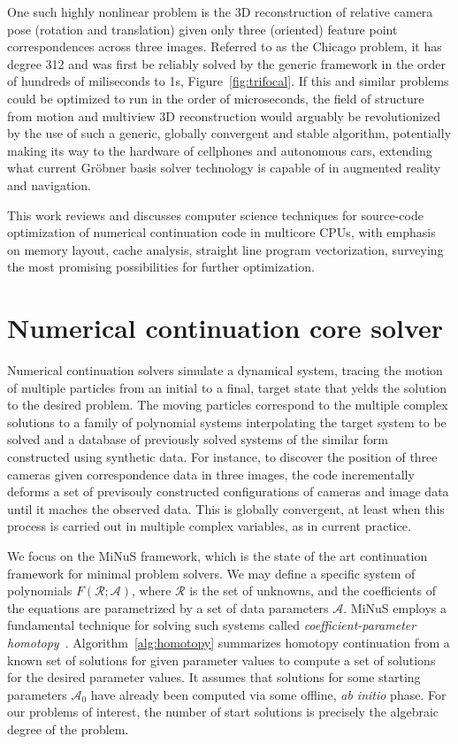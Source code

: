 \documentclass[10pt,conference]{IEEEtran}
\begin{document}
One such highly nonlinear problem is the 3D reconstruction of relative camera
pose (rotation and translation) given only three (oriented) feature point
correspondences across three images. Referred to as the Chicago problem, it has degree 312 and was first be
reliably solved by the generic framework in the order of hundreds of miliseconds
to 1s, Figure~\ref{fig:trifocal}. If this and similar problems could be
optimized to run in the order of microseconds, the field of structure from
motion and multiview 3D reconstruction would arguably be revolutionized by the
use of such a generic, globally convergent and stable algorithm, potentially
making its way to the hardware of cellphones and autonomous cars, extending what
current Gr\"obner basis solver technology is capable of in augmented reality and
navigation.

This work reviews and discusses computer science techniques for source-code
optimization of numerical continuation code in multicore CPUs, with emphasis on
memory layout, cache analysis, straight line program vectorization, surveying
the most promising possibilities for further optimization. 

\section{Numerical continuation core solver}

Numerical continuation solvers simulate a dynamical system, tracing the motion
of multiple particles from an initial to a final, target state that yelds the
solution to the desired problem. The moving particles correspond to the multiple
complex solutions to a family of polynomial systems interpolating the target
system to be solved and a database of previously solved systems of the similar
form constructed using synthetic data. For instance, to discover the position of
three cameras given correspondence data in three images, the code incrementally
deforms a set of previsouly constructed configurations of cameras and image data
until it maches the observed data. This is globally convergent, at least when
this process is carried out in multiple complex variables, as in current
practice.

We focus on the MiNuS framework, which is the state of the art continuation
framework for minimal problem solvers. We may define a specific system of
polynomials $F(\mathcal{R};\mathcal{A})$, where $\mathcal R$ is the set of
unknowns, and the coefficients of the equations are parametrized by a set of
data parameters $\mathcal A$.
MiNuS employs a fundamental technique for solving such systems called
\emph{coefficient-parameter homotopy}~\cite{SWbook}.
Algorithm~\ref{alg:homotopy} summarizes homotopy continuation from a known set
of solutions for given parameter values to compute a set of solutions for the
desired parameter values. It assumes that solutions for some starting parameters
$\mathcal{A}_0$ have already been computed via some offline, \emph{ab initio}
phase. For our problems of interest, the number of start solutions is precisely
the algebraic degree of the problem. 
\end{document}
